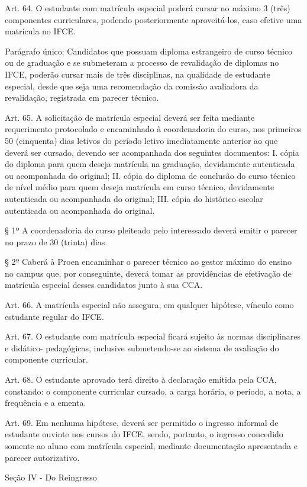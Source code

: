 {Art. 64. O estudante com matrícula especial poderá cursar no máximo 3 (três) componentes curriculares, podendo posteriormente aproveitá-los, caso efetive uma matrícula no IFCE.

Parágrafo único: Candidatos que possuam diploma estrangeiro de curso técnico ou de graduação e se submeteram a processo de revalidação de diplomas no IFCE, poderão cursar mais de três disciplinas, na qualidade de estudante especial, desde que seja uma recomendação da comissão avaliadora da revalidação, registrada em parecer técnico.

Art. 65. A solicitação de matrícula especial deverá ser feita mediante requerimento protocolado e encaminhado à coordenadoria do curso, nos primeiros 50 (cinquenta) dias letivos do período letivo imediatamente anterior ao que deverá ser cursado, devendo ser acompanhada dos seguintes documentos:
I. cópia do diploma para quem deseja matrícula na graduação, devidamente autenticada ou acompanhada do original;
II. cópia do diploma de conclusão do curso técnico de nível médio para quem deseja matrícula em curso técnico, devidamente autenticada ou acompanhada do original;
III. cópia do histórico escolar autenticada ou acompanhada do original.

§ 1º A coordenadoria do curso pleiteado pelo interessado deverá emitir o parecer no prazo de 30 (trinta) dias.

§ 2º Caberá à Proen encaminhar o parecer técnico ao gestor máximo do ensino no campus que, por conseguinte, deverá tomar as providências de efetivação de matrícula especial desses candidatos junto à sua CCA.

Art. 66. A matrícula especial não assegura, em qualquer hipótese, vínculo como estudante regular do IFCE.

Art. 67. O estudante com matrícula especial ficará sujeito às normas disciplinares e didático- pedagógicas, inclusive submetendo-se ao sistema de avaliação do componente curricular.

Art. 68. O estudante aprovado terá direito à declaração emitida pela CCA, constando: o componente curricular cursado, a carga horária, o período, a nota, a frequência e a ementa.

Art. 69. Em nenhuma hipótese, deverá ser permitido o ingresso informal de estudante ouvinte nos cursos do IFCE, sendo, portanto, o ingresso concedido somente ao aluno com matrícula especial, mediante documentação apresentada e parecer autorizativo.

\begin{center}
	Seção IV - Do Reingresso
\end{center}

}
